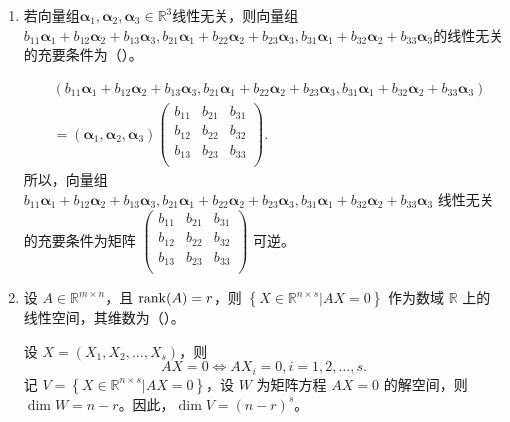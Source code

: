 \begin{enumerate}[1~]
\begin{enumerate}[1.~]
\item
若向量组$\boldsymbol{\alpha} _ { 1 } ,  \boldsymbol{\alpha} _ { 2 } ,  \boldsymbol{\alpha} _ { 3 } \in \mathbb{R} ^ { 3 }$线性无关，则向量组$b _ { 11 } \boldsymbol{\alpha} _ { 1 } + b _ { 12 } \boldsymbol{\alpha} _ { 2 } + b _ { 13 } \boldsymbol{\alpha} _ { 3 } ,  b _ { 21 } \boldsymbol{\alpha} _ { 1 } + b _ { 22 } \boldsymbol{\alpha} _ { 2 } + b _ { 23 } \boldsymbol{\alpha} _ { 3 }, b _ { 31 } \boldsymbol{\alpha} _ { 1 } + b _ { 32 } \boldsymbol{\alpha} _ { 2 } + b _ { 33 } \boldsymbol{\alpha} _ { 3 }$的线性无关的充要条件为（\quad）。
\begin{solution}
\begin{align*}
&(b _ { 11 } \boldsymbol{\alpha} _ { 1 } + b _ { 12 } \boldsymbol{\alpha} _ { 2 } + b _ { 13 } \boldsymbol{\alpha} _ { 3 } ,  b _ { 21 } \boldsymbol{\alpha} _ { 1 } + b _ { 22 } \boldsymbol{\alpha} _ { 2 } + b _ { 23 } \boldsymbol{\alpha} _ { 3 }, b _ { 31 } \boldsymbol{\alpha} _ { 1 } + b _ { 32 } \boldsymbol{\alpha} _ { 2 } + b _ { 33 } \boldsymbol{\alpha} _ { 3 })\\
&=(\boldsymbol{\alpha} _ { 1 } ,  \boldsymbol{\alpha} _ { 2 } ,  \boldsymbol{\alpha} _ { 3 })\left( \begin{matrix}
	b_{11}&		b_{21}&		b_{31}\\
	b_{12}&		b_{22}&		b_{32}\\
	b_{13}&		b_{23}&		b_{33}\\
\end{matrix} \right) .
\end{align*}
所以，向量组 $b _ { 11 } \boldsymbol{\alpha} _ { 1 } + b _ { 12 } \boldsymbol{\alpha} _ { 2 } + b _ { 13 } \boldsymbol{\alpha} _ { 3 } ,  b _ { 21 } \boldsymbol{\alpha} _ { 1 } + b _ { 22 } \boldsymbol{\alpha} _ { 2 } + b _ { 23 } \boldsymbol{\alpha} _ { 3 }, b _ { 31 } \boldsymbol{\alpha} _ { 1 } + b _ { 32 } \boldsymbol{\alpha} _ { 2 } + b _ { 33 } \boldsymbol{\alpha} _ { 3 }$ 线性无关的充要条件为矩阵 $\left( \begin{smallmatrix}
	b_{11}&		b_{21}&		b_{31}\\
	b_{12}&		b_{22}&		b_{32}\\
	b_{13}&		b_{23}&		b_{33}\\
\end{smallmatrix} \right) $ 可逆。
\end{solution}

\item
设 $A \in \mathbb{R} ^ { m \times n }$，且 ${\rm rank}(A)=r$，则 $\left\{ X \in \mathbb{R} ^ { n \times s } | A X = 0 \right\}$ 作为数域 $\mathbb{R}$ 上的线性空间，其维数为（\quad）。
\begin{solution}
设 $X = (X_1, X_2, \dots, X_s)$，则\[
AX = 0 \Longleftrightarrow AX_i = 0, i = 1, 2, \dots, s.
\]
记 $V = \left\{ X \in \mathbb{R} ^ { n \times s } | A X = 0 \right\}$，设 $W$ 为矩阵方程 $AX = 0$ 的解空间，则 $\dim W = n - r$。因此，$\dim V = (n - r)^s$。
\end{solution}



\end{enumerate}
\end{enumerate}
